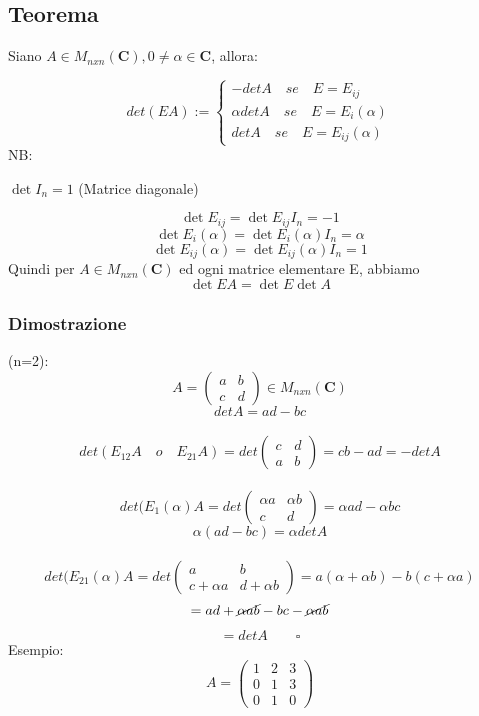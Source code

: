 \documentclass[12pt]{article}
\begin{document}
\subsection{Teorema}

Siano $A \in M_{nxn} (\mathbf{C}), 0 \neq \alpha \in \mathbf{C}$, allora:

\[det(EA) := \begin{cases}
    -detA \quad se \quad E = E_{ij}\\
    \alpha detA \quad se \quad E = E_i (\alpha)\\
    detA \quad se \quad E = E_{ij}(\alpha)
\end{cases}\]
NB:
\begin{center}
    $\det{I_n} = 1$ (Matrice diagonale)
\end{center}
\[\det{E_{ij}} = \det{E_{ij}I_n = -1}\]
\[\det{E_{i}(\alpha)} = \det{E_{i}(\alpha)I_n = \alpha}\]
\[\det{E_{ij}(\alpha)} = \det{E_{ij}(\alpha)I_n = 1}\]
Quindi per $A \in M_{nxn} (\mathbf{C})$ ed ogni matrice elementare E, abbiamo
\[\det{EA} = \det{E}\det{A}\]



\subsubsection{Dimostrazione}

(n=2): \[A = \begin{pmatrix}
    a & b\\
    c & d
\end{pmatrix} \in M_{nxn} (\mathbf{C})\]
\[detA = ad-bc\]
\\
\[det(E_{12}A \quad o \quad E_{21}A) = det \begin{pmatrix}
    c & d\\
    a & b
\end{pmatrix} = cb - ad = -detA\]
\\
\[det(E_1(\alpha)A = det \begin{pmatrix}
    \alpha a & \alpha b\\
    c & d
\end{pmatrix} = \alpha ad - \alpha bc\]
\[\alpha(ad-bc) = \alpha detA\]
\\
\[det(E_{21}(\alpha)A =  det \begin{pmatrix}
    a & b\\
    c + \alpha a & d + \alpha b
\end{pmatrix} = a(\alpha + \alpha b) - b(c + \alpha a)\]
\[= ad + \cancel{\alpha ab} - bc - \cancel{\alpha ab}\]
\[= detA \quad \quad \square\]
Esempio:
\[A = \begin{pmatrix}
    1 & 2 & 3\\
    0 & 1 & 3\\
    0 & 1 & 0
\end{pmatrix}\]
\end{document}
